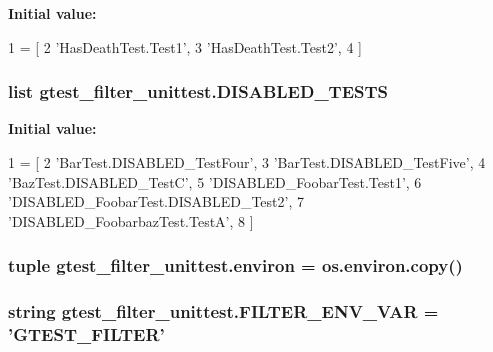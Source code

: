 {\bfseries Initial value\-:}
\begin{DoxyCode}
1 = [
2     \textcolor{stringliteral}{'HasDeathTest.Test1'},
3     \textcolor{stringliteral}{'HasDeathTest.Test2'},
4     ]
\end{DoxyCode}
\hypertarget{namespacegtest__filter__unittest_affe760ab1e8c4c7b61566076c37c1d69}{
\subsubsection[{D\-I\-S\-A\-B\-L\-E\-D\-\_\-\-T\-E\-S\-T\-S}]{\setlength{\rightskip}{0pt plus 5cm}list gtest\-\_\-filter\-\_\-unittest.\-D\-I\-S\-A\-B\-L\-E\-D\-\_\-\-T\-E\-S\-T\-S}}\label{namespacegtest__filter__unittest_affe760ab1e8c4c7b61566076c37c1d69}
{\bfseries Initial value\-:}
\begin{DoxyCode}
1 = [
2     \textcolor{stringliteral}{'BarTest.DISABLED\_TestFour'},
3     \textcolor{stringliteral}{'BarTest.DISABLED\_TestFive'},
4     \textcolor{stringliteral}{'BazTest.DISABLED\_TestC'},
5     \textcolor{stringliteral}{'DISABLED\_FoobarTest.Test1'},
6     \textcolor{stringliteral}{'DISABLED\_FoobarTest.DISABLED\_Test2'},
7     \textcolor{stringliteral}{'DISABLED\_FoobarbazTest.TestA'},
8     ]
\end{DoxyCode}
\hypertarget{namespacegtest__filter__unittest_a39a358caaa1ecaa4f0403093c48f08ee}{
\subsubsection[{environ}]{\setlength{\rightskip}{0pt plus 5cm}tuple gtest\-\_\-filter\-\_\-unittest.\-environ = os.\-environ.\-copy()}}\label{namespacegtest__filter__unittest_a39a358caaa1ecaa4f0403093c48f08ee}
\hypertarget{namespacegtest__filter__unittest_a3dbe99165209787d4d138d30673c95f5}{
\subsubsection[{F\-I\-L\-T\-E\-R\-\_\-\-E\-N\-V\-\_\-\-V\-A\-R}]{\setlength{\rightskip}{0pt plus 5cm}string gtest\-\_\-filter\-\_\-unittest.\-F\-I\-L\-T\-E\-R\-\_\-\-E\-N\-V\-\_\-\-V\-A\-R = 'G\-T\-E\-S\-T\-\_\-\-F\-I\-L\-T\-E\-R'}}\label{namespacegtest__filter__unittest_a3dbe99165209787d4d138d30673c95f5}
